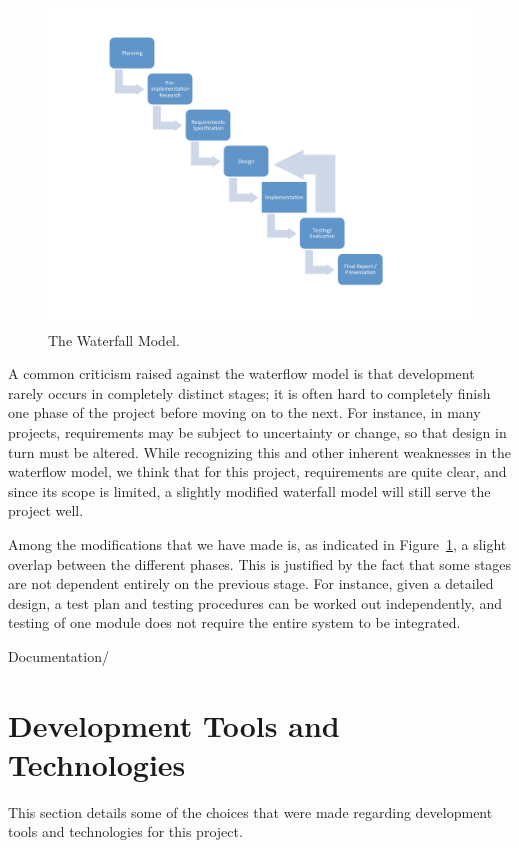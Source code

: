 \begin{figure}
  \begin{center}
    \includegraphics[width=\textwidth]{PrelimStudy/workflow}
    \caption{The Waterfall Model.}
    \label{workflow}
  \end{center}
\end{figure}

A common criticism raised against the waterflow model is that development rarely occurs in completely distinct stages; it is often hard to completely finish one phase of the project before moving on to the next. For instance, in many projects, requirements may be subject to uncertainty or change, so that design in turn must be altered. While recognizing this and other inherent weaknesses in the waterflow model, we think that for this project, requirements are quite clear, and since its scope is limited, a slightly modified waterfall model will still serve the project well. 

Among the modifications that we have made is, as indicated in Figure~\ref{workflow}, a slight overlap between the different phases. This is justified by the fact that some stages are not dependent entirely on the previous stage. For instance, given a detailed design, a test plan and testing procedures can be worked out independently, and testing of one module does not require the entire system to be integrated.


Documentation/
\section{Development Tools and Technologies}\label{DevTools}
This section details some of the choices that were made regarding development tools and technologies for this project.

